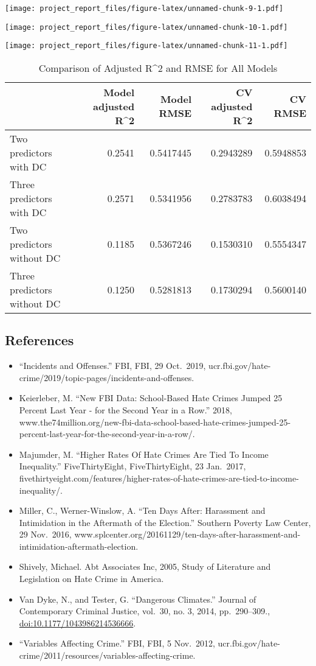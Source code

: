 \documentclass[
]{article}
\providecommand{\tightlist}{%
  \setlength{\itemsep}{0pt}\setlength{\parskip}{0pt}}
\begin{document}
\texttt{[image: project\_report\_files/figure-latex/unnamed-chunk-9-1.pdf]}

\texttt{[image: project\_report\_files/figure-latex/unnamed-chunk-10-1.pdf]}

\texttt{[image: project\_report\_files/figure-latex/unnamed-chunk-11-1.pdf]}

\begin{table}

\caption{\label{tab:unnamed-chunk-12}Comparison of Adjusted R^2 and RMSE for All Models}
\centering
\begin{tabular}[t]{l|r|r|r|r}
\hline
  & Model adjusted R\textasciicircum{}2 & Model RMSE & CV adjusted R\textasciicircum{}2 & CV RMSE\\
\hline
Two predictors with DC & 0.2541 & 0.5417445 & 0.2943289 & 0.5948853\\
\hline
Three predictors with DC & 0.2571 & 0.5341956 & 0.2783783 & 0.6038494\\
\hline
Two predictors without DC & 0.1185 & 0.5367246 & 0.1530310 & 0.5554347\\
\hline
Three predictors without DC & 0.1250 & 0.5281813 & 0.1730294 & 0.5600140\\
\hline
\end{tabular}
\end{table}

\hypertarget{references}{%
\subsection{References}\label{references}}

\begin{itemize}
\tightlist
\item
  ``Incidents and Offenses.'' FBI, FBI, 29 Oct.~2019,
  ucr.fbi.gov/hate-crime/2019/topic-pages/incidents-and-offenses.
\item
  Keierleber, M. ``New FBI Data: School-Based Hate Crimes Jumped 25
  Percent Last Year - for the Second Year in a Row.'' 2018,
  www.the74million.org/new-fbi-data-school-based-hate-crimes-jumped-25-percent-last-year-for-the-second-year-in-a-row/.
\item
  Majumder, M. ``Higher Rates Of Hate Crimes Are Tied To Income
  Inequality.'' FiveThirtyEight, FiveThirtyEight, 23 Jan.~2017,
  fivethirtyeight.com/features/higher-rates-of-hate-crimes-are-tied-to-income-inequality/.
\item
  Miller, C., Werner-Winslow, A. ``Ten Days After: Harassment and
  Intimidation in the Aftermath of the Election.'' Southern Poverty Law
  Center, 29 Nov.~2016,
  www.splcenter.org/20161129/ten-days-after-harassment-and-intimidation-aftermath-election.\\
\item
  Shively, Michael. Abt Associates Inc, 2005, Study of Literature and
  Legislation on Hate Crime in America.
\item
  Van Dyke, N., and Tester, G. ``Dangerous Climates.'' Journal of
  Contemporary Criminal Justice, vol.~30, no. 3, 2014, pp.~290--309.,
  \url{doi:10.1177/1043986214536666}.
\item
  ``Variables Affecting Crime.'' FBI, FBI, 5 Nov.~2012,
  ucr.fbi.gov/hate-crime/2011/resources/variables-affecting-crime.
\end{itemize}
\end{document}
